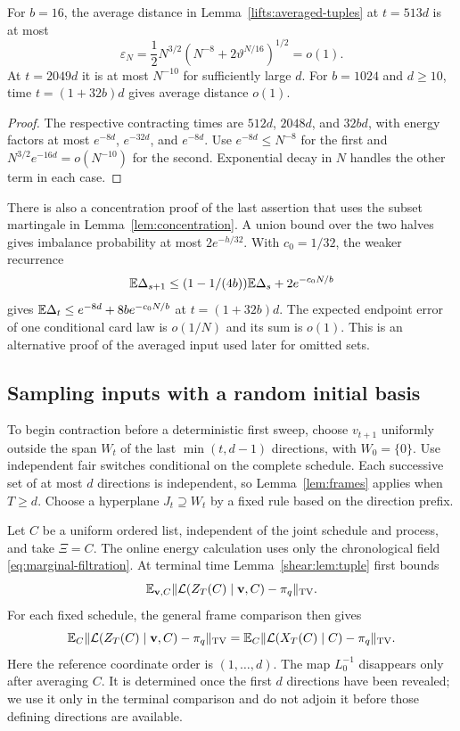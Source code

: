 \begin{corollary}
\label{lifts:tuple-constants}
For $b=16$, the average distance in
Lemma~\ref{lifts:averaged-tuples} at $t=513d$ is at most
\[
 \varepsilon_N=\frac12N^{3/2}
       \left(N^{-8}+2\vartheta^{N/16}\right)^{1/2}=o(1).
\]
At $t=2049d$ it is at most $N^{-10}$ for sufficiently large
$d$. For $b=1024$ and $d\ge10$, time $t=(1+32b)d$ gives average distance
$o(1)$.
\end{corollary}
\begin{proof}
The respective contracting times are $512d$, $2048d$, and
$32bd$, with energy factors at most $e^{-8d}$, $e^{-32d}$,
and $e^{-8d}$. Use $e^{-8d}\le N^{-8}$ for the first and
$N^{3/2}e^{-16d}=o(N^{-10})$ for the second. Exponential
decay in $N$ handles the other term in each case.
\end{proof}

There is also a concentration proof of the last assertion that
uses the subset martingale in Lemma~\ref{lem:concentration}.
A union bound over the two halves gives imbalance probability
at most $2e^{-h/32}$. With $c_0=1/32$, the weaker recurrence
\begin{equation}\label{lifts:azuma-recurrence}
 \mathbb E\Delta_{s+1}\le(1-1/(4b))\mathbb E\Delta_s+2e^{-c_0N/b}
\end{equation}
gives $\mathbb E\Delta_t\le e^{-8d}+8b e^{-c_0N/b}$ at
$t=(1+32b)d$. The expected endpoint error of one conditional
card law is $o(1/N)$ and its sum is $o(1)$. This is an
alternative proof of the averaged input used later for omitted
sets.

\subsection{Sampling inputs with a random initial basis}
\label{frames:average-section}

To begin contraction before a deterministic first sweep, choose
$v_{t+1}$ uniformly outside the span $W_t$ of the last
$\min(t,d-1)$ directions, with $W_0=\{0\}$. Use independent
fair switches conditional on the complete schedule. Each
successive set of at most $d$ directions is independent, so
Lemma~\ref{lem:frames} applies when $T\ge d$. Choose a
hyperplane $J_t\supseteq W_t$ by a fixed rule based on the
direction prefix.

Let $C$ be a uniform ordered list, independent of the joint
schedule and process, and take $\Xi=C$. The online energy
calculation uses only the chronological field
\eqref{eq:marginal-filtration}. At terminal time
Lemma~\ref{shear:lem:tuple} first bounds
\[
 \mathbb E_{\mathbf v,C}
 \|\mathcal L(Z_T(C)\mid\mathbf v,C)-\pi_q\|_{\mathrm{TV}}.
\]
For each fixed schedule, the general frame comparison then gives
\begin{equation}\label{shear:eq:sampled-frame-transfer}
 \mathbb E_C\|\mathcal L(Z_T(C)\mid\mathbf v,C)-\pi_q\|_{\mathrm{TV}}
 =
 \mathbb E_C\|\mathcal L(X_T(C)\mid C)-\pi_q\|_{\mathrm{TV}}.
\end{equation}
Here the reference coordinate order is $(1,\ldots,d)$.
The map $L_0^{-1}$ disappears only after averaging $C$. It is
determined once the first $d$ directions have been revealed; we
use it only in the terminal comparison and do not adjoin it
before those defining directions are available.


